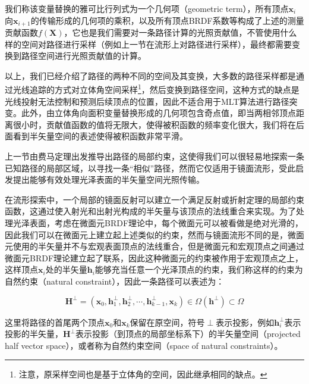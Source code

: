 我们称该变量替换的雅可比行列式为一个几何项（geometric term），所有顶点$\mathbf{x}_i$向$\mathbf{x}_{i+1}$的传输形成的几何项的乘积，以及所有顶点BRDF系数等构成了上述的测量贡献函数$f(\mathbf{X})$，它也是我们需要对一条路径计算的光照贡献值，不管使用什么样的空间对路径进行采样（例如上一节在流形上对路径进行采样），最终都需要变换到路径空间进行光照贡献值的计算。

以上，我们已经介绍了路径的两种不同的空间及其变换，大多数的路径采样都是通过光线追踪的方式对立体角空间采样\footnote{注意，原采样空间也是基于立体角的空间，因此继承相同的缺点。}，然后变换到路径空间，这种方式的缺点是光线投射无法控制和预测后续顶点的位置，因此不适合用于MLT算法进行路径突变。此外，由立体角向面积变量替换形成的几何项包含奇点值，即当两相邻顶点距离很小时，贡献值函数的值将无限大，使得被积函数的频率变化很大，我们将在后面看到半矢量空间的表述使得被积函数非常平滑。

上一节由费马定理出发推导出路径的局部约束，这使得我们可以很轻易地探索一条已知路径的局部区域，以寻找一条“相似”路径，然而它仅适用于镜面流形，\cite{a:TheNaturalConstraintRepresentationofthePathSpaceforEfficientLightTransportSimulation}受此启发提出能够有效处理光泽表面的半矢量空间光照传输。

在流形探索中，一个局部的镜面反射可以建立一个满足反射或折射定理的局部约束函数，这通过使入射光和出射光构成的半矢量与该顶点的法线重合来实现。为了处理光泽表面，考虑在微面元BRDF理论中，每个微面元可以被看做是绝对光滑的，因此我们可以在微面元上建立起上述类似的约束，然而与镜面流形不同的是，微面元使用的半矢量并不与宏观表面顶点的法线重合，但是微面元和宏观顶点之间通过微面元BRDF理论建立起了联系，因此这种微面元的约束被作用于宏观顶点之上，这样顶点$\mathbf{x}_i$处的半矢量$\mathbf{h}_i$能够充当任意一个光泽顶点的约束，我们称这样的约束为自然约束（natural constraint），因此一条路径可以表述为：

\begin{equation}\label{e:mlt-half-vector-space}
	\mathbf{H}^{\perp}=(\mathbf{x}_0,\mathbf{h}^{\perp}_1,\mathbf{h}^{\perp}_2,\cdots,\mathbf{h}^{\perp}_{k-1},\mathbf{x}_k)\in\Omega(\mathbf{h}^{\perp})\subset\Omega
\end{equation}

这里将路径的首尾两个顶点$\mathbf{x}_0$和$\mathbf{x}_k$保留在原空间，符号$\perp$表示投影，例如$\mathbf{h}^{\perp}_i$表示投影的半矢量，$\mathbf{H}^{\perp}$表示投影（到顶点的局部坐标系下）的半矢量空间（projected half vector space），或者称为自然约束空间（space of natural constraints）。

